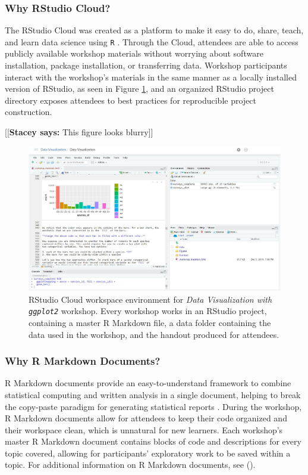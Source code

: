 \documentclass[12pt]{article}
\newcommand{\stacey}[1]{{\color{purple}[[\textbf{Stacey says: }#1]]}}
\begin{document}
\subsubsection{Why RStudio Cloud?} 

\quad The RStudio Cloud was created as a platform to make it easy to do, share,
teach, and learn data science using \texttt{R} \citep{RStudioCloud}. Through the 
Cloud, attendees are able to access publicly available workshop materials 
without worrying about software installation, package installation, or
transferring data. Workshop participants interact with the workshop's materials
in the same manner as a locally installed version of RStudio, as seen in Figure
\ref{fig:cloud}, and an organized RStudio project directory exposes attendees to 
best practices for reproducible project construction. 

\stacey{This figure looks blurry}
\begin{figure}[t!]
    \centering
    \includegraphics[width = \textwidth]{images/RStudio_Cloud_blind.png}
    \caption{RStudio Cloud workspace environment for \emph{Data Visualization
    with \texttt{ggplot2}} workshop. Every workshop works in an RStudio project,
    containing a master R Markdown file, a data folder containing the
    data used in the workshop, and the handout produced for attendees.} 
    \label{fig:cloud}
\end{figure}

\subsubsection{Why R Markdown Documents?}

\quad R Markdown documents provide an easy-to-understand framework to combine
statistical computing and written analysis in a single document, helping to
break the copy-paste paradigm for generating statistical reports 
\citep{mine-rmarkdown}. During the workshop, R Markdown documents allow for 
attendees to keep their code organized and their workspace clean, which is
unnatural for new learners. Each workshop's master R Markdown document contains
blocks of code and descriptions for every topic covered, allowing for
participants' exploratory work to be saved within a topic. For additional
information on R Markdown documents, see \citeauthor{mine-rmarkdown} 
(\citeyear{mine-rmarkdown}). 
\end{document}
